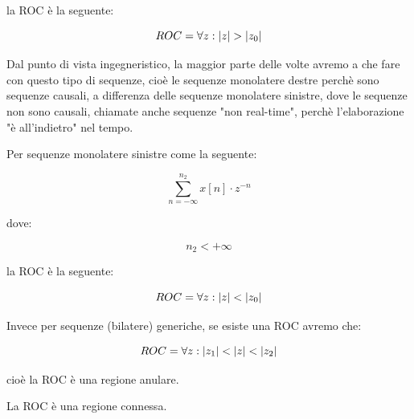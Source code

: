 la ROC è la seguente: 

{
    \Large 
    \begin{equation}
        ROC = \forall z: \abs{z} > \abs{z_0}
    \end{equation}
}

\begin{tcolorbox}
Dal punto di vista ingegneristico, la maggior parte delle volte avremo a che fare con questo tipo di sequenze, 
cioè le sequenze monolatere destre perchè sono sequenze causali, a differenza delle sequenze monolatere sinistre, 
dove le sequenze non sono causali, chiamate anche sequenze "non real-time", perchè l'elaborazione "è all'indietro" nel tempo.     
\end{tcolorbox}

\newpage 

Per sequenze monolatere sinistre come la seguente:

{
    \Large 
    \begin{equation}
        \sum_{n = - \infty}^{n_2}
        x \left[ n\right] \cdot z^{-n}
    \end{equation}
}

dove: 

{
    \Large 
    \begin{equation}
        n_2 < + \infty
    \end{equation}
}

la ROC è la seguente: 

{
    \Large 
    \begin{equation}
        ROC = \forall z: \abs{z} < \abs{z_0}
    \end{equation}
}

Invece per sequenze (bilatere) generiche, se esiste una ROC avremo che: 

{
    \Large 
    \begin{equation}
        ROC = \forall z: \abs{z_1}< \abs{z} < \abs{z_2}
    \end{equation}
}

cioè la ROC è una regione anulare. \newline 

La ROC è una regione connessa. \newline 

